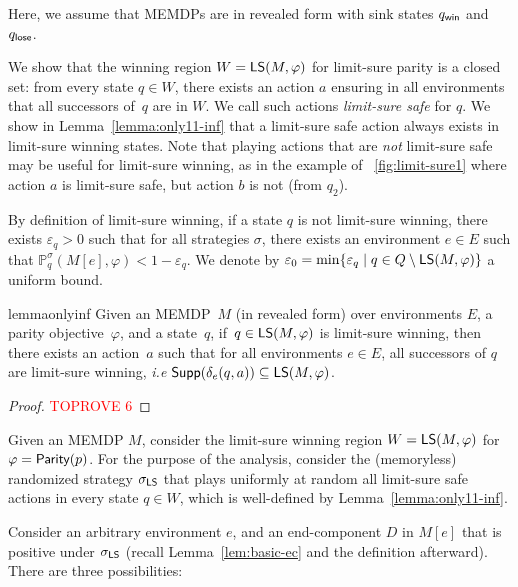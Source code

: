 \documentclass[a4paper,USenglish,cleveref, autoref, thm-restate]{lipics-v2021}
\let\epsilon\varepsilon
\newcommand*{\pr}{\mathbb{P}}
\newcommand\Supp{\textrm{\sf Supp}}
\newcommand\limitsure{\textrm{\sf LS}}
\newcommand\Parity{\textrm{\sf Parity}}
\def\loseabsorb{q_{\sf lose}}
\def\winabsorb{q_{\sf win}}
\begin{document}
Here, we assume that MEMDPs are in revealed form
with sink states $\winabsorb$ and $\loseabsorb$.

We show that the winning region $W = \limitsure(M,\varphi)$ 
for limit-sure parity is a closed set: from every state $q \in W$,
there exists an action $a$ ensuring in all environments
that all successors of~$q$ are in $W$.
We call such actions \emph{limit-sure safe} for $q$.
We show in Lemma~\ref{lemma:only11-inf} that a limit-sure safe action always exists in 
limit-sure winning states. 
Note that playing actions that are \emph{not} limit-sure safe may be useful 
for limit-sure winning, as in the example of \figurename~\ref{fig:limit-sure1} 
where action $a$ is limit-sure safe, but action $b$ is not (from $q_2$).


By definition of limit-sure winning, if a state $q$ is not limit-sure winning,
there exists $\epsilon_q > 0$ such that for all strategies $\sigma$, there
exists an environment $e \in E$ such that $\pr_{q}^{\sigma}(M[e], \varphi) < 1-\epsilon_q$.
We denote by $\epsilon_0 = \min \{\epsilon_q \mid q \in Q \setminus \limitsure(M,\varphi)\}$
a uniform bound.


\begin{restatable}{lemma}{onlyinf}
\label{lemma:only11-inf}
	Given an MEMDP~$M$ (in revealed form) over environments $E$, a parity objective~$\varphi$, and a state~$q$,
	if~$q \in \limitsure(M,\varphi)$ is limit-sure winning, then there exists an action~$a$ such that
	for all environments $e\in E$, all successors of $q$ are limit-sure winning, 
	\textit{i.e} $\Supp(\delta_e(q,a))\subseteq \limitsure(M,\varphi)$.
\end{restatable}


\begin{proof}\textcolor{red}{TOPROVE 6}\end{proof}


Given an MEMDP $M$, consider the limit-sure winning region $W = \limitsure(M,\varphi)$ 
for $\varphi = \Parity(p)$.
For the purpose of the analysis, consider the (memoryless) randomized strategy $\sigma_{\limitsure}$ that plays uniformly at random 
all limit-sure safe actions in every state $q \in W$, 
which is well-defined by Lemma~\ref{lemma:only11-inf}. 

Consider an arbitrary environment $e$, and an end-component $D$ in $M[e]$ that is positive under $\sigma_{\limitsure}$
(recall Lemma~\ref{lem:basic-ec} and the definition afterward). There are three possibilities:
\end{document}

